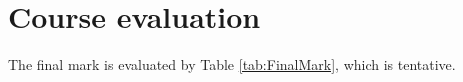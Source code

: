 \documentclass[onecolumn,pra,superscriptaddress]{revtex4-1}
\begin{document}
%
%
%
%
%
%
%
%
%
%





\section{Course evaluation}
The final mark is evaluated by Table \ref{tab:FinalMark}, which is tentative.
\end{document}
